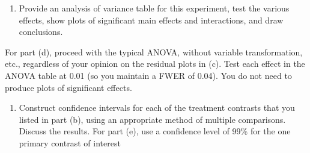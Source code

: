 \documentclass[12pt,]{article}
\providecommand{\tightlist}{%
  \setlength{\itemsep}{0pt}\setlength{\parskip}{0pt}}
\begin{document}
\begin{enumerate}
\def\labelenumi{(\alph{enumi})}
\setcounter{enumi}{3}
\tightlist
\item
  Provide an analysis of variance table for this experiment, test the
  various effects, show plots of significant main effects and
  interactions, and draw conclusions.
\end{enumerate}

For part (d), proceed with the typical ANOVA, without variable
transformation, etc., regardless of your opinion on the residual plots
in (c). Test each effect in the ANOVA table at 0.01 (so you maintain a
FWER of 0.04). You do not need to produce plots of significant effects.

\begin{enumerate}
\def\labelenumi{(\alph{enumi})}
\setcounter{enumi}{4}
\tightlist
\item
  Construct confidence intervals for each of the treatment contrasts
  that you listed in part (b), using an appropriate method of multiple
  comparisons. Discuss the results. For part (e), use a confidence level
  of 99\% for the one primary contrast of interest
\end{enumerate}
\end{document}
